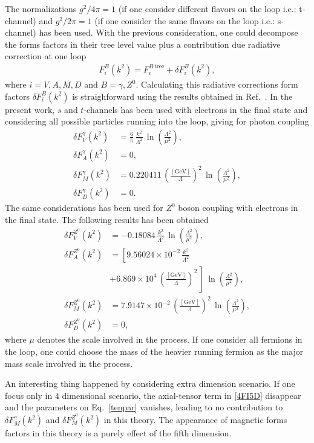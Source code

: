 The normalizations $g^2/4\pi = 1$ (if one consider different flavors on the loop i.e.: t-channel) and $g^2/2\pi = 1$ (if one consider the same flavors on the loop i.e.: s-channel) has been used. With the previous consideration, one could decompose the forms factors in their tree level value plus a contribution due radiative correction at one loop
\begin{align}
F_i^B(k^2) = F_i^{B\,\text{tree}} + \delta F_i^B(k^2),
\end{align}
where $i=V,A,M,D$ and $B=\gamma,Z^0$. Calculating this radiative corrections form factors $\delta F_i^B(k^2)$ is straighforward using the results obtained in Ref.~\cite{GonzalezGarcia:1998ay}. In the present work, $s$ and $t$-channels has been used with electrons in the final state and considering all possible particles running into the loop, giving for photon coupling
\begin{align}
 \delta F_V^\gamma(k^2) &= \frac{6}{\pi}\,\frac{k^2}{\Lambda^2}\,\ln\left(\frac{\Lambda^2}{\mu^2}\right), \\
 \delta F_A^\gamma(k^2) &= 0 , \\
 \delta F_M^\gamma(k^2) &= 0.220411\,\left(\frac{[\text{GeV}]}{\Lambda}\right)^2\,\ln\left(\frac{\Lambda^2}{\mu^2}\right), \\
 \delta F_D^\gamma(k^2) &= 0.
\end{align}
The same considerations has been used for $Z^0$ boson coupling with electrons in the final state. The following results has been obtained
\begin{align}
 \delta F_V^{Z^0}(k^2) &= -0.18084\,\frac{k^2}{\Lambda^2}\,\ln\left(\frac{\Lambda^2}{\mu^2}\right), \\
 \nonumber
 \delta F_A^{Z^0}(k^2) &= \left[9.56024\times10^{-2}\,\frac{k^2}{\Lambda^2} \right. \\
 & \left.+6.869\times10^4\,\left(\frac{[\text{GeV}]}{\Lambda}\right)^2\,\right]\,\ln\left(\frac{\Lambda^2}{\mu^2}\right), \\
 \delta F_M^{Z^0}(k^2) &= 7.9147\times10^{-2}\,\left(\frac{[\text{GeV}]}{\Lambda}\right)^2\,\ln\left(\frac{\Lambda^2}{\mu^2}\right), \\
 \delta F_D^{Z^0}(k^2) &= 0,
\end{align}
where $\mu$ denotes the scale involved in the process. If one consider all fermions in the loop, one could choose the mass of the heavier running fermion as the major mass scale involved in the process.

An interesting thing happened by considering extra dimension scenario. If one focus only in $4$ dimensional scenario, the axial-tensor term in \eqref{4FI5D} disappear and the parameters on Eq.~\eqref{tenpar} vanishes, leading to no contribution to $\delta F_M^\gamma(k^2)$ and $\delta F_M^{Z^0}(k^2)$ in this theory. The appearance of magnetic forms factors in this theory is a purely effect of the fifth dimension. 

